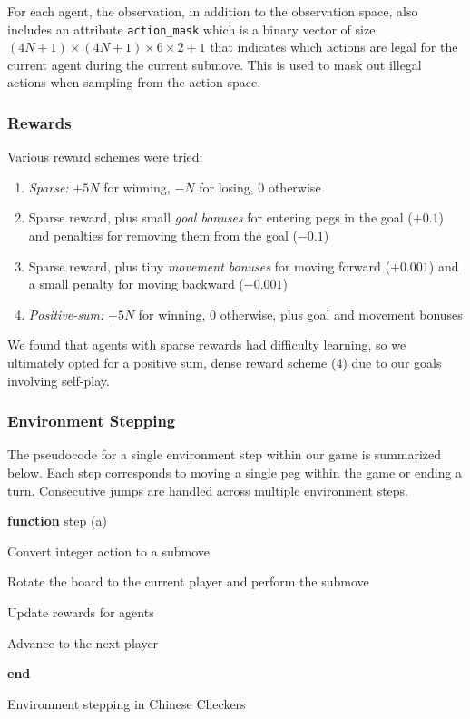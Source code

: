 \documentclass[12pt, a4paper, twocolumn]{article}
\begin{document}
For each agent, the observation, in addition to the observation space, also includes an attribute \texttt{action\_mask} which is a binary vector of size $(4N + 1) \times (4N + 1) \times 6 \times 2 + 1$ that indicates which actions are legal for the current agent during the current submove. This is used to mask out illegal actions when sampling from the action space.

\subsubsection{Rewards}

Various reward schemes were tried:

\begin{enumerate}
  \item \textit{Sparse:} $+5N$ for winning, $-N$ for losing, $0$ otherwise
  \item Sparse reward, plus small \textit{goal bonuses} for entering pegs in the goal ($+0.1$) and penalties for removing them from the goal ($-0.1$)
  \item Sparse reward, plus tiny \textit{movement bonuses} for moving forward ($+0.001$) and a small penalty for moving backward ($-0.001$)
  \item \textit{Positive-sum:} $+5N$ for winning, $0$ otherwise, plus goal and movement bonuses
\end{enumerate}

We found that agents with sparse rewards had difficulty learning, so we ultimately opted for a positive sum, dense reward scheme (4) due to our goals involving self-play.

\subsubsection{Environment Stepping}

The pseudocode for a single environment step within our game is summarized below. Each step corresponds to moving a single peg within the game or ending a turn. Consecutive jumps are handled across multiple environment steps.

\begin{algorithm}

  \textbf{function} step (a)
  
  \Indp

  \Input{a: Integer action in $[0, (4N + 1) \times (4N + 1) \times 6 \times 2 + 1)$}
  
  Convert integer action to a submove

  Rotate the board to the current player and perform the submove

  Update rewards for agents

    {
      Advance to the next player
    }

  \Indm

  \textbf{end}

  \caption{Environment stepping in Chinese Checkers}
\end{algorithm}
  
\end{document}
